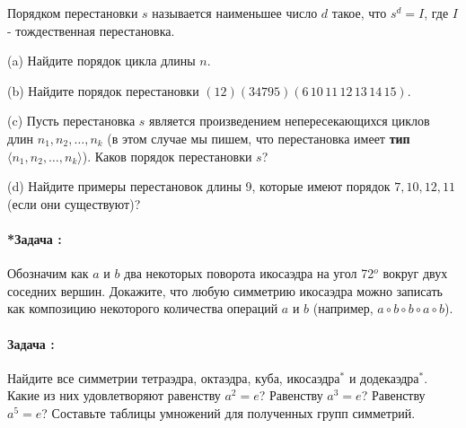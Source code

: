 \documentclass[amsmath,amssymb,12pt]{revtex4}
\newif\ifimportant
\newcommand{\1}{\frac{1}{2}}
\begin{document}
Порядком перестановки $s$ называется наименьшее число $d$ такое, что $s^{d}=I$, где $I$ - тождественная перестановка. 

\noindent
(a) Найдите порядок цикла длины $n$. 

\noindent
(b) Найдите порядок перестановки $(12)(34795)(6\,10\,11\,12\,13\,14\,15)$.

\noindent
(c) Пусть перестановка $s$ является произведением непересекающихся циклов длин $n_{1},n_{2}, \ldots, n_{k}$ (в этом случае мы пишем, что перестановка имеет \textbf{тип} $\langle n_{1},n_{2},\ldots, n_{k}\rangle$). Каков порядок перестановки $s$?

\noindent
(d) Найдите примеры перестановок длины 9, которые имеют порядок $7, 10, 12, 11$ (если они существуют)?




\addtocounter{prn}{1}
\vspace{0.3cm}
\paragraph*{*Задача \theprn: }

Обозначим как $a$ и $b$ два некоторых поворота икосаэдра на угол 72$^{o}$ вокруг двух соседних вершин. Докажите, что любую симметрию икосаэдра можно записать как композицию некоторого количества операций $a$ и $b$ (например, $a\circ b\circ b\circ a\circ b$). 






\addtocounter{prn}{1}
\vspace{0.3cm}
\paragraph*{Задача \theprn: }

Найдите все симметрии тетраэдра, октаэдра, куба, икосаэдра$^{*}$ и додекаэдра$^{*}$. Какие из них удовлетворяют равенству $a^{2}=e$? Равенству $a^{3}=e$? Равенству $a^{5}=e$? Составьте таблицы умножений для полученных групп симметрий.


\end{document}
